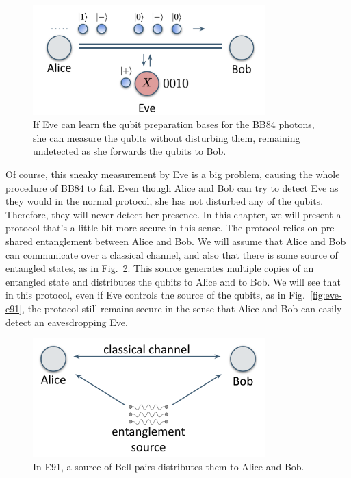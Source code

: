 \begin{figure}[H]
    \centering
    \includegraphics[width=0.8\textwidth]{lesson10/eavesdropping-on-bb84.png}
        \caption[Successful eavesdropping on BB84]{If Eve can learn the qubit preparation bases for the BB84 photons, she can measure the qubits without disturbing them, remaining undetected as she forwards the qubits to Bob.}
    \label{fig:eve-bb84}
\end{figure}

Of course, this sneaky measurement by Eve is a big problem, causing the whole procedure of BB84 to fail. Even though Alice and Bob can try to detect Eve as they would in the normal protocol, she has not disturbed any of the qubits. Therefore, they will never detect her presence. In this chapter, we will present a protocol that's a little bit more secure in this sense. The protocol relies on pre-shared entanglement between Alice and Bob. We will assume that Alice and Bob can communicate over a classical channel, and also that there is some source of entangled states, as in Fig.~\ref{fig:e91-setup}. This source generates multiple copies of an entangled state and distributes the qubits to Alice and to Bob. We will see that in this protocol, even if Eve controls the source of the qubits, as in Fig.~\ref{fig:eve-e91}, the protocol still remains secure in the sense that Alice and Bob can easily detect an eavesdropping Eve.

\begin{figure}[H]
    \centering
    \includegraphics[width=0.8\textwidth]{lesson10/e91-setup.png}
        \caption[E91 setup]{In E91, a source of Bell pairs distributes them to Alice and Bob.}
    \label{fig:e91-setup}
\end{figure}

